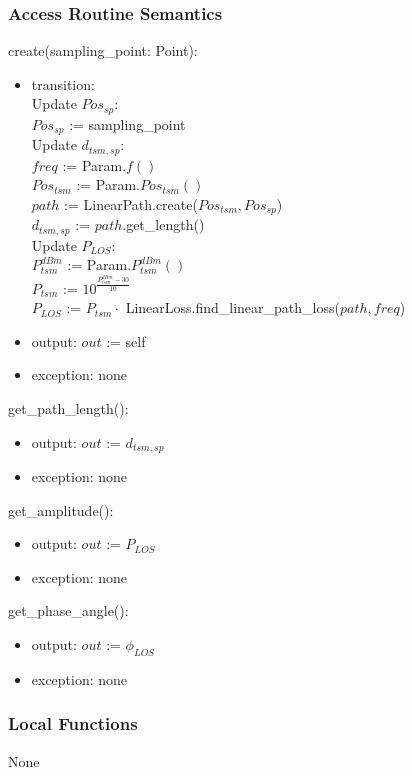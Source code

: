 \documentclass[12pt, titlepage]{article}
\begin{document}
\subsubsection{Access Routine Semantics}

\noindent create(sampling\_point: Point):
\begin{itemize}
\item transition: \\
Update $Pos_{sp}$:\\
$Pos_{sp}$ := sampling\_point\\

Update $d_{tsm,sp}$:\\
$freq$ := Param.$f()$\\
$Pos_{tsm}$ := Param.$Pos_{tsm}()$\\
$path$ := LinearPath.create($Pos_{tsm}, Pos_{sp}$)\\
$d_{tsm,sp}$ := $path$.get\_length()\\

Update $P_{LOS}$:\\
$P_{tsm}^{dBm}$ := Param.$P_{tsm}^{dBm}()$\\
$P_{tsm}$ := $10^\frac{P_{tsm}^{dBm}-30}{10}$\\
$P_{LOS}$ := $P_{tsm} \cdot$ LinearLoss.find\_linear\_path\_loss($path, freq$)\\
\item output: $out$ := self
\item exception: none
\end{itemize}

\noindent get\_path\_length():
\begin{itemize}
\item output: $out$ := $d_{tsm,sp}$
\item exception: none
\end{itemize}

\noindent get\_amplitude():
\begin{itemize}
\item output: $out$ := $P_{LOS}$
\item exception: none
\end{itemize}

\noindent get\_phase\_angle():
\begin{itemize}
\item output: $out$ := $\phi_{LOS}$
\item exception: none
\end{itemize}

\subsubsection{Local Functions}
None
\end{document}
